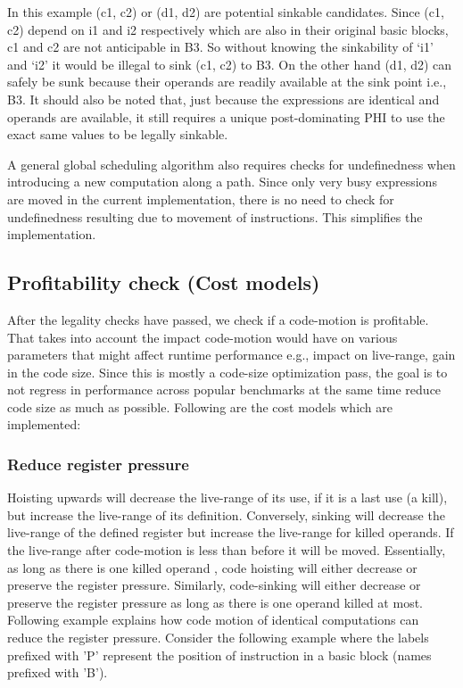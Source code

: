 \documentclass[acmlarge,review]{acmart}\settopmatter{printfolios=true}
\begin{document}
In this example (c1, c2) or (d1, d2) are potential sinkable candidates. Since
(c1, c2) depend on i1 and i2 respectively which are also in their original basic
blocks, c1 and c2 are not anticipable in B3. So without knowing the sinkability
of `i1' and `i2' it would be illegal to sink (c1, c2) to B3. On the other hand
(d1, d2) can safely be sunk because their operands are readily available at the
sink point i.e., B3. It should also be noted that, just because the expressions
are identical and operands are available, it still requires a unique
post-dominating PHI to use the exact same values to be legally sinkable.

A general global scheduling algorithm also requires checks for undefinedness
when introducing a new computation along a path. Since only very busy
expressions are moved in the current implementation, there is no need to check
for undefinedness resulting due to movement of instructions. This simplifies the
implementation.

\subsection{Profitability check (Cost models)}
\label{sec:cost-models}
After the legality checks have passed, we check if a code-motion is profitable.
That takes into account the impact code-motion would have on various parameters
that might affect runtime performance e.g., impact on live-range, gain in the
code size. Since this is mostly a code-size optimization pass, the goal is to
not regress in performance across popular benchmarks at the same time reduce
code size as much as possible. Following are the cost models which are
implemented:

\subsubsection{Reduce register pressure}
\label{hoist:reg-pressure}
Hoisting upwards will decrease the live-range of its use, if it is a last use (a
kill), but increase the live-range of its definition. Conversely, sinking will
decrease the live-range of the defined register but increase the live-range for
killed operands. If the live-range after code-motion is less than before it will
be moved. Essentially, as long as there is one killed operand , code hoisting
will either decrease or preserve the register pressure.  Similarly, code-sinking
will either decrease or preserve the register pressure as long as there is one
operand killed at most.  Following example explains how code motion of identical
computations can reduce the register pressure.  Consider the following example
where the labels prefixed with 'P' represent the position of instruction in a
basic block (names prefixed with 'B').
\end{document}
